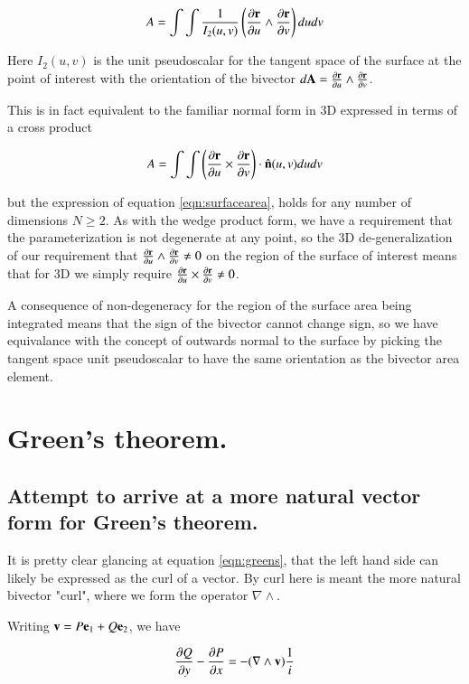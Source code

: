 \documentclass{article}
\newcommand{\grad}[0]{\nabla}
\newcommand{\PD}[2]{\frac{\partial {#2}}{\partial {#1}}}
\begin{document}
\begin{equation}\label{eqn:surfacearea}
A = \int\int \inv{I_2(u,v)} \left(\PD{u}{\Br} \wedge \PD{v}{\Br}\right) du dv
\end{equation}

Here $I_2(u,v)$ is the unit pseudoscalar for the tangent space of the surface at the point of interest with the orientation of the bivector 
$d\BA = \PD{u}{\Br} \wedge \PD{v}{\Br}$.

This is in fact equivalent to the familiar normal form in 3D expressed in terms
of a cross product

\begin{equation}
A = \int\int \left(\PD{u}{\Br} \cross \PD{v}{\Br}\right) \cdot \ncap(u,v) du dv
\end{equation}

but the expression of equation \ref{eqn:surfacearea}, holds for any number of dimensions $N \ge 2$.  As with the wedge product form, we have a requirement that the parameterization is not degenerate at any point, so the 3D de-generalization of our requirement that
$\PD{u}{\Br} \wedge \PD{v}{\Br} \ne 0$
on the region of the surface of interest means that for 3D we simply require
$\PD{u}{\Br} \cross \PD{v}{\Br} \ne 0$.

A consequence of non-degeneracy for the region of the surface area being integrated means that the sign of the bivector cannot change sign, so we have equivalance with the concept of outwards normal to the surface by picking the tangent space unit pseudoscalar to have the same orientation as the bivector area element.

\section{ Green's theorem. }

\subsection{ Attempt to arrive at a more natural vector form for Green's theorem. }

It is pretty clear glancing at equation \ref{eqn:greens}, that the left
hand side can likely be expressed as the curl of a vector.  By curl here
is meant the more natural bivector "curl", where we form the operator $\grad \wedge$.

Writing $\mathbf{v} = P \mathbf{e}_1 + Q \mathbf{e}_2$, we have

\begin{equation*}
\PD{y}{Q} - \PD{x}{P} = -(\grad \wedge \Bv) \inv{i}
\end{equation*}
\end{document}
